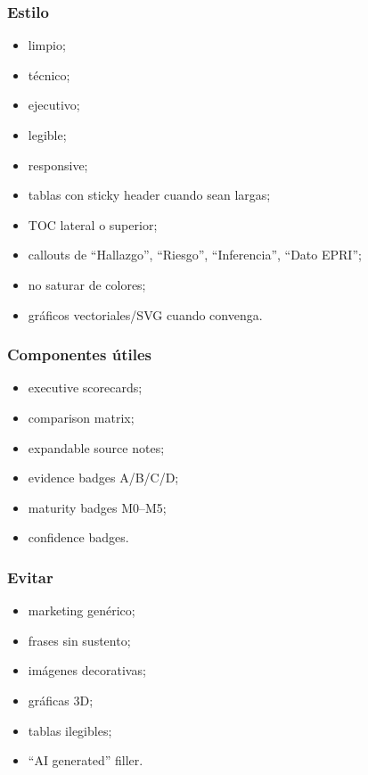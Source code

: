 \documentclass[11pt,a4paper]{article}
\begin{document}
\subsubsection*{Estilo}
\begin{itemize}
\item limpio;
\item técnico;
\item ejecutivo;
\item legible;
\item responsive;
\item tablas con sticky header cuando sean largas;
\item TOC lateral o superior;
\item callouts de ``Hallazgo'', ``Riesgo'', ``Inferencia'', ``Dato EPRI'';
\item no saturar de colores;
\item gráficos vectoriales/SVG cuando convenga.
\end{itemize}


\subsubsection*{Componentes útiles}
\begin{itemize}
\item executive scorecards;
\item comparison matrix;
\item expandable source notes;
\item evidence badges A/B/C/D;
\item maturity badges M0–M5;
\item confidence badges.
\end{itemize}


\subsubsection*{Evitar}
\begin{itemize}
\item marketing genérico;
\item frases sin sustento;
\item imágenes decorativas;
\item gráficas 3D;
\item tablas ilegibles;
\item ``AI generated'' filler.
\end{itemize}
\end{document}
